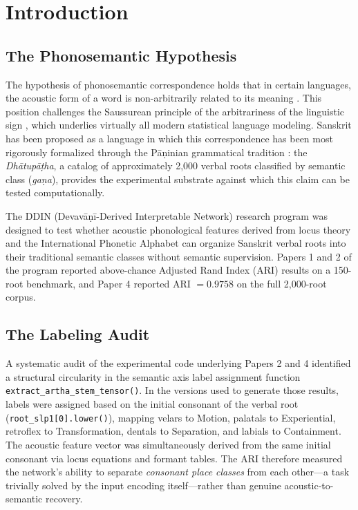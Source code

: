 \documentclass{article}
\begin{document}
\section{Introduction}

\subsection{The Phonosemantic Hypothesis}

The hypothesis of phonosemantic correspondence holds that in certain
languages, the acoustic form of a word is non-arbitrarily related to its
meaning \citep{hinton1994,magnus2001,blasi2016}. This position challenges
the Saussurean principle of the arbitrariness of the linguistic sign
\citep{saussure1916}, which underlies virtually all modern statistical
language modeling. Sanskrit has been proposed as a language in which
this correspondence has been most rigorously formalized through the
Pāṇinian grammatical tradition \citep{cardona1997}: the
\textit{Dhātupāṭha}, a catalog of approximately 2,000 verbal roots
classified by semantic class (\textit{gaṇa}), provides the experimental
substrate against which this claim can be tested computationally.

The DDIN (Devavāṇī-Derived Interpretable Network) research program
\citep{kumar2026phonosemantic,kumar2026ddin,kumar2026esl} was designed
to test whether acoustic phonological features derived from locus theory
and the International Phonetic Alphabet can organize Sanskrit verbal roots
into their traditional semantic classes without semantic supervision. Papers
1 and 2 of the program reported above-chance Adjusted Rand Index (ARI)
results on a 150-root benchmark, and Paper 4 reported ARI $= 0.9758$ on
the full 2,000-root corpus.

\subsection{The Labeling Audit}

A systematic audit of the experimental code underlying Papers 2 and 4
identified a structural circularity in the semantic axis label assignment
function \texttt{extract\_artha\_stem\_tensor()}. In the versions used
to generate those results, labels were assigned based on the initial
consonant of the verbal root (\texttt{root\_slp1[0].lower()}), mapping
velars to Motion, palatals to Experiential, retroflex to Transformation,
dentals to Separation, and labials to Containment. The acoustic feature
vector was simultaneously derived from the same initial consonant via
locus equations and formant tables. The ARI therefore measured the
network's ability to separate \emph{consonant place classes} from each
other---a task trivially solved by the input encoding itself---rather than
genuine acoustic-to-semantic recovery.
\end{document}
